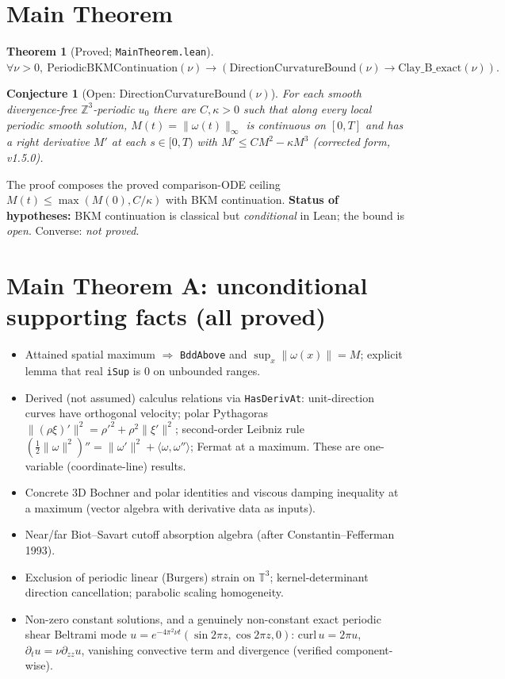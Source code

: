 \documentclass[11pt]{article}
\newtheorem{theorem}{Theorem}\newtheorem{conjecture}{Conjecture}
\begin{document}
\section{Main Theorem}
\begin{theorem}[Proved; \texttt{MainTheorem.lean}]
$\forall\nu>0,\ \mathrm{PeriodicBKMContinuation}(\nu)\to(\mathrm{DirectionCurvatureBound}(\nu)\to\mathrm{Clay\_B\_exact}(\nu)).$
\end{theorem}
\begin{conjecture}[Open: $\mathrm{DirectionCurvatureBound}(\nu)$]
For each smooth divergence-free $\mathbb{Z}^3$-periodic $u_0$ there are $C,\kappa>0$ such that along every local periodic smooth solution, $M(t)=\|\omega(t)\|_\infty$ is continuous on $[0,T]$ and has a right derivative $M'$ at each $s\in[0,T)$ with $M'\le C M^2-\kappa M^3$ (corrected form, v1.5.0).
\end{conjecture}
The proof composes the proved comparison-ODE ceiling $M(t)\le\max(M(0),C/\kappa)$ with BKM continuation. \textbf{Status of hypotheses:} BKM continuation is classical but \emph{conditional} in Lean; the bound is \emph{open}. Converse: \emph{not proved}.
\section{Main Theorem A: unconditional supporting facts (all proved)}
\begin{itemize}
\item Attained spatial maximum $\Rightarrow$ \texttt{BddAbove} and $\sup_x\|\omega(x)\|=M$; explicit lemma that real \texttt{iSup} is $0$ on unbounded ranges.
\item Derived (not assumed) calculus relations via \texttt{HasDerivAt}: unit-direction curves have orthogonal velocity; polar Pythagoras $\|(\rho\xi)'\|^2=\rho'^2+\rho^2\|\xi'\|^2$; second-order Leibniz rule $(\tfrac12\|\omega\|^2)''=\|\omega'\|^2+\langle\omega,\omega''\rangle$; Fermat at a maximum. These are one-variable (coordinate-line) results.
\item Concrete 3D Bochner and polar identities and viscous damping inequality at a maximum (vector algebra with derivative data as inputs).
\item Near/far Biot--Savart cutoff absorption algebra (after Constantin--Fefferman 1993).
\item Exclusion of periodic linear (Burgers) strain on $\mathbb{T}^3$; kernel-determinant direction cancellation; parabolic scaling homogeneity.
\item Non-zero constant solutions, and a genuinely non-constant exact periodic shear Beltrami mode $u=e^{-4\pi^2\nu t}(\sin2\pi z,\cos2\pi z,0)$: $\mathrm{curl}\,u=2\pi u$, $\partial_tu=\nu\partial_{zz}u$, vanishing convective term and divergence (verified component-wise).
\end{itemize}
\end{document}
